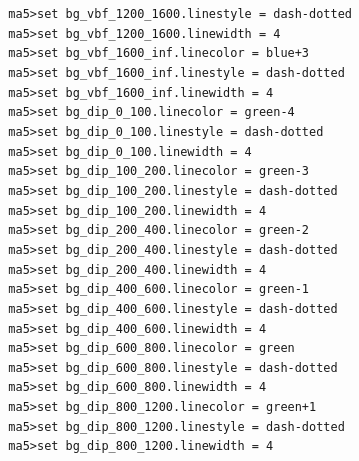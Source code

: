 \documentclass[a4paper, 10pt]{article}
\begin{document}
\texttt{ }\texttt{ }\texttt{ma5>set bg\_vbf\_1200\_1600.linestyle = dash-dotted\\
}
\texttt{ }\texttt{ }\texttt{ma5>set bg\_vbf\_1200\_1600.linewidth = 4\\
}
\texttt{ }\texttt{ }\texttt{ma5>set bg\_vbf\_1600\_inf.linecolor = blue+3\\
}
\texttt{ }\texttt{ }\texttt{ma5>set bg\_vbf\_1600\_inf.linestyle = dash-dotted\\
}
\texttt{ }\texttt{ }\texttt{ma5>set bg\_vbf\_1600\_inf.linewidth = 4\\
}
\texttt{ }\texttt{ }\texttt{ma5>set bg\_dip\_0\_100.linecolor = green-4\\
}
\texttt{ }\texttt{ }\texttt{ma5>set bg\_dip\_0\_100.linestyle = dash-dotted\\
}
\texttt{ }\texttt{ }\texttt{ma5>set bg\_dip\_0\_100.linewidth = 4\\
}
\texttt{ }\texttt{ }\texttt{ma5>set bg\_dip\_100\_200.linecolor = green-3\\
}
\texttt{ }\texttt{ }\texttt{ma5>set bg\_dip\_100\_200.linestyle = dash-dotted\\
}
\texttt{ }\texttt{ }\texttt{ma5>set bg\_dip\_100\_200.linewidth = 4\\
}
\texttt{ }\texttt{ }\texttt{ma5>set bg\_dip\_200\_400.linecolor = green-2\\
}
\texttt{ }\texttt{ }\texttt{ma5>set bg\_dip\_200\_400.linestyle = dash-dotted\\
}
\texttt{ }\texttt{ }\texttt{ma5>set bg\_dip\_200\_400.linewidth = 4\\
}
\texttt{ }\texttt{ }\texttt{ma5>set bg\_dip\_400\_600.linecolor = green-1\\
}
\texttt{ }\texttt{ }\texttt{ma5>set bg\_dip\_400\_600.linestyle = dash-dotted\\
}
\texttt{ }\texttt{ }\texttt{ma5>set bg\_dip\_400\_600.linewidth = 4\\
}
\texttt{ }\texttt{ }\texttt{ma5>set bg\_dip\_600\_800.linecolor = green\\
}
\texttt{ }\texttt{ }\texttt{ma5>set bg\_dip\_600\_800.linestyle = dash-dotted\\
}
\texttt{ }\texttt{ }\texttt{ma5>set bg\_dip\_600\_800.linewidth = 4\\
}
\texttt{ }\texttt{ }\texttt{ma5>set bg\_dip\_800\_1200.linecolor = green+1\\
}
\texttt{ }\texttt{ }\texttt{ma5>set bg\_dip\_800\_1200.linestyle = dash-dotted\\
}
\texttt{ }\texttt{ }\texttt{ma5>set bg\_dip\_800\_1200.linewidth = 4\\
}
\end{document}
